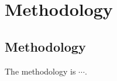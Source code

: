 \section{Methodology}\label{sec:methodology}

\subsection{Methodology}\label{subsec:methodology}

The methodology is $\cdots$.
